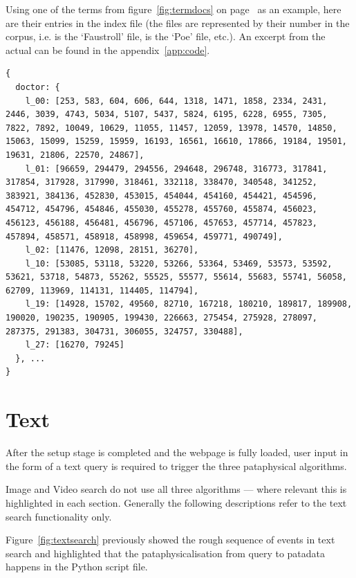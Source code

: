 Using one of the terms from figure~\ref{fig:termdocs} on page~\pageref{fig:termdocs} as an example, here are their entries in the index file (the files are represented by their number in the corpus, i.e.  is the `Faustroll' file,  is the `Poe' file, etc.). An excerpt from the actual  can be found in the appendix~\ref{app:code}.

\label{c:pos}
\begin{verbatim}
{
  doctor: {
    l_00: [253, 583, 604, 606, 644, 1318, 1471, 1858, 2334, 2431, 2446, 3039, 4743, 5034, 5107, 5437, 5824, 6195, 6228, 6955, 7305, 7822, 7892, 10049, 10629, 11055, 11457, 12059, 13978, 14570, 14850, 15063, 15099, 15259, 15959, 16193, 16561, 16610, 17866, 19184, 19501, 19631, 21806, 22570, 24867],
    l_01: [96659, 294479, 294556, 294648, 296748, 316773, 317841, 317854, 317928, 317990, 318461, 332118, 338470, 340548, 341252, 383921, 384136, 452830, 453015, 454044, 454160, 454421, 454596, 454712, 454796, 454846, 455030, 455278, 455760, 455874, 456023, 456123, 456188, 456481, 456796, 457106, 457653, 457714, 457823, 457894, 458571, 458918, 458998, 459654, 459771, 490749],
    l_02: [11476, 12098, 28151, 36270],
    l_10: [53085, 53118, 53220, 53266, 53364, 53469, 53573, 53592, 53621, 53718, 54873, 55262, 55525, 55577, 55614, 55683, 55741, 56058, 62709, 113969, 114131, 114405, 114794],
    l_19: [14928, 15702, 49560, 82710, 167218, 180210, 189817, 189908, 190020, 190235, 190905, 199430, 226663, 275454, 275928, 278097, 287375, 291383, 304731, 306055, 324757, 330488],
    l_27: [16270, 79245]
  }, ...
}
\end{verbatim}


\section{Text}
\label{s:algorithms}

After the setup stage is completed and the webpage is fully loaded, user input in the form of a text query is required to trigger the three pataphysical algorithms.

Image and Video search do not use all three algorithms --- where relevant this is highlighted in each section. Generally the following descriptions refer to the text search functionality only.

Figure~\ref{fig:textsearch} previously showed the rough sequence of events in text search and highlighted that the pataphysicalisation from query to patadata happens in the  Python script file.


